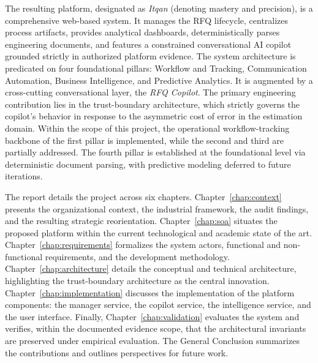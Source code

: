 The resulting platform, designated as \textit{Itqan} (denoting mastery and precision), is a comprehensive web-based system. It manages the RFQ lifecycle, centralizes process artifacts, provides analytical dashboards, deterministically parses engineering documents, and features a constrained conversational AI copilot grounded strictly in authorized platform evidence. The system architecture is predicated on four foundational pillars: Workflow and Tracking, Communication Automation, Business Intelligence, and Predictive Analytics. It is augmented by a cross-cutting conversational layer, the \textit{RFQ Copilot}. The primary engineering contribution lies in the trust-boundary architecture, which strictly governs the copilot's behavior in response to the asymmetric cost of error in the estimation domain. Within the scope of this project, the operational workflow-tracking backbone of the first pillar is implemented, while the second and third are partially addressed. The fourth pillar is established at the foundational level via deterministic document parsing, with predictive modeling deferred to future iterations.

The report details the project across six chapters. Chapter~\ref{chap:context} presents the organizational context, the industrial framework, the audit findings, and the resulting strategic reorientation. Chapter~\ref{chap:soa} situates the proposed platform within the current technological and academic state of the art. Chapter~\ref{chap:requirements} formalizes the system actors, functional and non-functional requirements, and the development methodology. Chapter~\ref{chap:architecture} details the conceptual and technical architecture, highlighting the trust-boundary architecture as the central innovation. Chapter~\ref{chap:implementation} discusses the implementation of the platform components: the manager service, the copilot service, the intelligence service, and the user interface. Finally, Chapter~\ref{chap:validation} evaluates the system and verifies, within the documented evidence scope, that the architectural invariants are preserved under empirical evaluation. The General Conclusion summarizes the contributions and outlines perspectives for future work.
